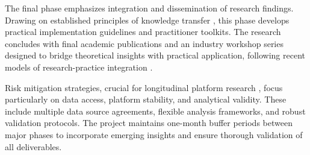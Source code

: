 The final phase emphasizes integration and dissemination of research findings. Drawing on established principles of knowledge transfer \parencite{hansen1999}, this phase develops practical implementation guidelines and practitioner toolkits. The research concludes with final academic publications and an industry workshop series designed to bridge theoretical insights with practical application, following recent models of research-practice integration \parencite{chen2022}.

Risk mitigation strategies, crucial for longitudinal platform research \parencite{johnson2024}, focus particularly on data access, platform stability, and analytical validity. These include multiple data source agreements, flexible analysis frameworks, and robust validation protocols. The project maintains one-month buffer periods between major phases to incorporate emerging insights and ensure thorough validation of all deliverables. 
